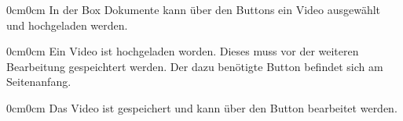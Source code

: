 \documentclass[parskip=off,index=totocnumbered]{scrartcl}
\newenvironment{rückkeinstück}
	{\begin{adjustwidth}{0cm}{0cm}\footnotesize \singlespace \centering} 
	{\end{adjustwidth} \onehalfspacing}
\newenvironment{rückkeinstück2}
	{\begin{adjustwidth}{0cm}{0cm}\footnotesize \singlespace} 
	{\end{adjustwidth} \onehalfspacing}
\begin{document}
\noindent \begin{minipage}{\textwidth}
    \vspace{0.6cm}
    \begin{rückkeinstück2}
        In der Box \textsf{Dokumente} kann über den Buttons  ein Video ausgewählt und hochgeladen werden.
    \end{rückkeinstück2}
\end{minipage}

\noindent \begin{minipage}{\textwidth}
    \vspace{0.6cm}
    \begin{rückkeinstück2}
        Ein Video ist hochgeladen worden. Dieses muss vor der weiteren Bearbeitung gespeichtert werden. Der dazu benötigte Button befindet sich am Seitenanfang.
    \end{rückkeinstück2}
\end{minipage}
              
\noindent \begin{minipage}{\textwidth}
    \begin{rückkeinstück}
        Das Video ist gespeichert und kann über den Button  bearbeitet werden.
    \end{rückkeinstück}
\end{minipage}              
\end{document}
